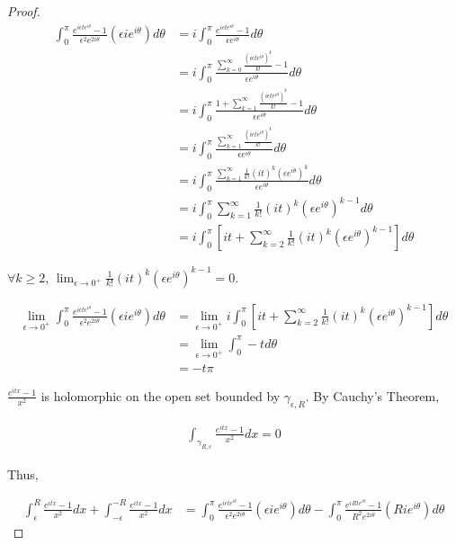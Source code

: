 \documentclass{article}
\begin{document}
\begin{proof}
    \begin{align*}
        \int_{0}^{\pi} \frac{e^{i \epsilon te^{i \theta}} - 1}{\epsilon^2e^{2i\theta}}\left(\epsilon ie^{i \theta}\right) d \theta &= i\int_{0}^{\pi} \frac{e^{i \epsilon te^{i \theta}} - 1}{\epsilon e^{i\theta}} d \theta \\
        &= i\int_{0}^{\pi} \frac{\sum_{k = 0}^{\infty}\frac{(i \epsilon te^{i \theta})^k}{k!} - 1}{\epsilon e^{i\theta}} d \theta \\
        &= i\int_{0}^{\pi} \frac{1 + \sum_{k = 1}^{\infty}\frac{(i \epsilon te^{i \theta})^k}{k!} - 1}{\epsilon e^{i\theta}} d \theta \\
        &= i\int_{0}^{\pi} \frac{\sum_{k = 1}^{\infty}\frac{(i \epsilon te^{i \theta})^k}{k!}}{\epsilon e^{i\theta}} d \theta \\
        &= i\int_{0}^{\pi} \frac{\sum_{k = 1}^{\infty}\frac{1}{k!}(it)^k (\epsilon e^{i \theta})^k}{\epsilon e^{i\theta}} d \theta \\
        &= i\int_{0}^{\pi} \sum_{k = 1}^{\infty}\frac{1}{k!}(it)^k (\epsilon e^{i \theta})^{k - 1} d \theta \\ 
        &= i\int_{0}^{\pi} \left[it + \sum_{k = 2}^{\infty}\frac{1}{k!}(it)^k (\epsilon e^{i \theta})^{k - 1} \right] d \theta
    \end{align*}

    $\forall k \geq 2$, $\lim_{\epsilon \to 0^+}\frac{1}{k!}(it)^k (\epsilon e^{i \theta})^{k - 1} = 0 $. 

    \begin{align*}
        \lim_{\epsilon \to 0^+} \int_{0}^{\pi} \frac{e^{i \epsilon te^{i \theta}} - 1}{\epsilon^2e^{2i\theta}}\left(\epsilon ie^{i \theta}\right) d \theta &= \lim_{\epsilon \to 0^+} i\int_{0}^{\pi} \left[it + \sum_{k = 2}^{\infty}\frac{1}{k!}(it)^k (\epsilon e^{i \theta})^{k - 1} \right] d \theta \\
        &= \lim_{\epsilon \to 0^+} \int_{0}^{\pi} -t d \theta \\
        &= -t \pi
    \end{align*}

    $\frac{e^{it x} - 1}{x^2}$ is holomorphic on the open set bounded by $\gamma_{\epsilon, R}$. By Cauchy's Theorem,

    \begin{align*}
        \int_{\gamma_{R, \epsilon}} \frac{e^{itx} - 1}{x^2} dx = 0
    \end{align*}

    Thus, 

    \begin{align*}
        \int_{\epsilon}^{R} \frac{e^{itx} - 1}{x^2} dx +\int_{-\epsilon}^{-R} \frac{e^{itx} - 1}{x^2} dx &= \int_{0}^{\pi} \frac{e^{i \epsilon te^{i \theta}} - 1}{\epsilon^2e^{2i\theta}}\left(\epsilon ie^{i \theta}\right) d \theta -  \int_{0}^{\pi} \frac{e^{iRte^{i \theta}} - 1}{R^2e^{2i\theta}}\left(Rie^{i \theta}\right) d \theta
    \end{align*}


\end{proof}
\end{document}
